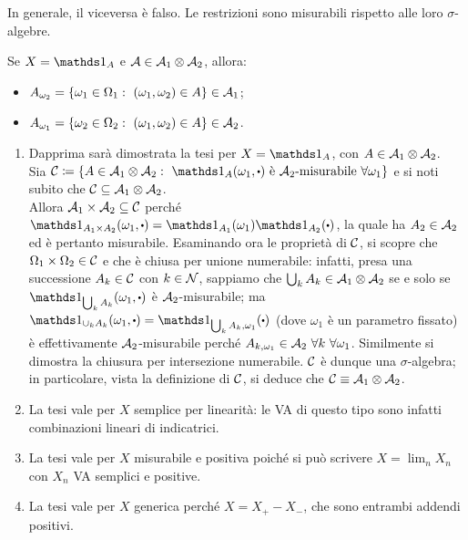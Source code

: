 In generale, il viceversa è falso. Le restrizioni sono misurabili rispetto alle loro $\sigma$-algebre.
\medskip
\begin{nb}
  Se $X=\Ind_A$ e $\mathcal A \in \mathcal A_1 \otimes \mathcal A_2$, allora:
  \begin{itemize}
    \item
      $A_{\omega_2}=\left \{\omega_1 \in \Omega_1 : \ (\omega_1, \omega_2) \in A \right \} \in \mathcal A_1$;
    \item
      $A_{\omega_1}=\left \{\omega_2 \in \Omega_2: \ (\omega_1, \omega_2) \in A \right \} \in \mathcal A_2$.
    \end{itemize}
\end{nb}

\medskip

\begin{dimo}
  \Fixvmode
  \begin{enumerate}
    \renewcommand{\labelenumi}{\alph{enumi})}
    \item Dapprima sarà dimostrata la tesi per $X=\Ind_A$, con $A \in \mathcal A_1 \otimes \mathcal A_2$.\\
    Sia $\Cc \coloneqq \left \{ A \in \Ac_1\otimes\Ac_2: \ \Ind_A(\omega_1, \bigcdot) \ \text{è} \ \Ac_2\text{-misurabile} \ \forall\omega_1 \right \}$ e si noti subito che $\mathcal C \subseteq \mathcal A_1 \otimes \mathcal A_2$. \\
    Allora $\mathcal A_1 \times \mathcal A_2 \subseteq \mathcal C$ perché $ \Ind_{A_1\times A_2}(\omega_1,\bigcdot)=\Ind_{A_1}(\omega_1)\Ind_{A_2}(\bigcdot)$, la quale ha $A_2 \in \mathcal A_2$ ed è pertanto misurabile.
    Esaminando ora le proprietà di $\mathcal C$, si scopre che $\Omega_1\times\Omega_2 \in \mathcal C$ e che è chiusa per unione numerabile: infatti, presa una successione $A_k \in \mathcal C$ con $k \in \mathcal N$, sappiamo che $\bigcup_k A_k \in \mathcal A_1 \otimes \mathcal A_2$ se e solo se $\Ind_{\bigcup_k A_k}(\omega_1,\bigcdot)$ è $\mathcal A_2$-misurabile; ma $\Ind_{\cup_{k}A_k}(\omega_1, \bigcdot)=\Ind_{\bigcup_{k}A_k, \omega_1}(\bigcdot)$ (dove $\omega_1$ è un parametro fissato) è effettivamente $\mathcal A_2$-misurabile perché $A_{k,\omega_1} \in \mathcal A_2 \ \forall k \ \forall \omega_1$. Similmente si dimostra la chiusura per intersezione numerabile. $\mathcal C$ è dunque una $\sigma$-algebra; in particolare, vista la definizione di $\mathcal C$, si deduce che $\mathcal C \equiv \mathcal A_1\otimes\mathcal A_2$.
    \item La tesi vale per $X$ semplice per linearità: le VA di questo tipo sono infatti combinazioni lineari di indicatrici.
    \item La tesi vale per $X$ misurabile e positiva poiché si può scrivere $X = \lim_n X_n$ con $X_n$ VA semplici e positive.
    \item La tesi vale per $X$ generica perché $X=X_+-X_-$, che sono entrambi addendi positivi. \qedhere
  \end{enumerate}
\end{dimo}

